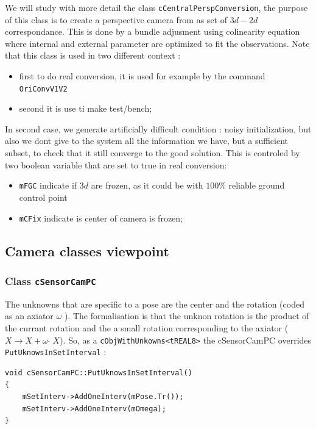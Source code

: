 We will study with more detail the class {\tt cCentralPerspConversion}, the purpose
of this class is to create a perspective camera from  as set of $3d-2d$ correspondance.
This is done by a bundle adjusment using colinearity equation where internal and
external parameter are optimized to fit the observations.
Note that this class is used in two different context :

\begin{itemize}
   \item first to do real conversion,  it is used for example by the command {\tt OriConvV1V2}
   \item second  it is use ti make test/bench; 
\end{itemize}

In second case, we generate artificially difficult condition : noisy initialization, but
also we dont give to the system all the information we have, but a sufficient subset, to
check that it still converge to the good solution. This is controled by two boolean
variable that are set to true in real conversion: 

\begin{itemize}
   \item {\tt  mFGC}   indicate if $3d$ are frozen, as it could be with $100\%$ reliable ground control point
                       
   \item {\tt mCFix} indicate is center of camera is frozen;
\end{itemize}


\subsection{Camera classes viewpoint}


\subsubsection{Class {\tt cSensorCamPC}}

The unknowns that are specific to a pose are the center  and  the rotation (coded as an axiator $\omega$ ).
The  formalisation is that the unknon rotation is the product of the currant rotation
and the a small rotation corresponding to the axiator ($X \rightarrow X + \omega\; \hat{}\; X$).
So, as a    {\tt cObjWithUnkowns<tREAL8>} the cSensorCamPC overrides {\tt PutUknowsInSetInterval} :

\begin{lstlisting}
void cSensorCamPC::PutUknowsInSetInterval()
{
    mSetInterv->AddOneInterv(mPose.Tr());
    mSetInterv->AddOneInterv(mOmega);
}
\end{lstlisting}

